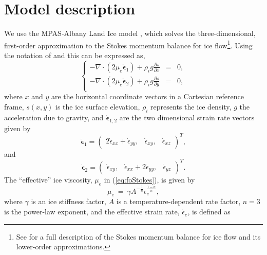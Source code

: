 \documentclass[review,oneside]{igs}
\begin{document}
\section{Model description}
We use the MPAS-Albany Land Ice model \citep[MALI;][]{hoffman2018}, which solves the three-dimensional, first-order approximation to the Stokes momentum balance for ice flow\footnote{See \citet{schoof2013} for a full description of the Stokes momentum balance for ice flow and its lower-order approximations.}. Using the notation  of \citet{perego2012} and \citet{tezaur2015a} this can be expressed as, 
\begin{equation} \label{eq:foStokes}
\left\{
\begin{array}{rcl} -\nabla \cdot (2 \mu_e \dot{\boldsymbol{\epsilon}}_1) + \rho_{i} g
\frac{\partial s}{\partial x}&=&0, \\
-\nabla \cdot (2 \mu_e \dot{\boldsymbol{\epsilon}}_2) +\rho_{i} g
\frac{\partial s}{\partial y} &=& 0, \\
\end{array}\right.
\end{equation}
where $x$ and $y$ are the horizontal coordinate vectors in a Cartesian reference frame, $s(x,y)$ is the ice surface elevation, $\rho_{i}$ represents the ice density, $g$ the acceleration due to gravity, and $\dot{\boldsymbol{\epsilon}}_{1,2}$ are the two dimensional strain rate vectors given by
\begin{equation}
\dot{\boldsymbol{\epsilon}}_1 = \left(\begin{array}{ccc}
2\dot{\epsilon}_{xx} + \dot{\epsilon}_{yy}, &\dot{\epsilon}_{xy},&
\dot{\epsilon}_{xz}\end{array}\right)^T,
\end{equation}
and
\begin{equation}
\dot{\boldsymbol{\epsilon}}_2 = \left(
\begin{array}{ccc}\dot{\epsilon}_{xy}, &
\dot{\epsilon}_{xx} + 2\dot{\epsilon}_{yy}, &\dot{\epsilon}_{yz}
\end{array}\right)^T.
\end{equation}
The ``effective'' ice viscosity, $ \mu_e$ in  (\ref{eq:foStokes}), is given by 
\begin{equation}
\label{eq:effvisc}
    \mu_{e}~=~\gamma A^{-\frac{1}{n}}\dot{\epsilon}_{e}^{\frac{1-n}{n}},
\end{equation}
where $\gamma$ is an ice stiffness factor, $A$ is a temperature-dependent rate factor, $n=3$ is the power-law exponent, and the effective strain rate, $\dot{\epsilon}_{e}$, is defined as
\end{document}
